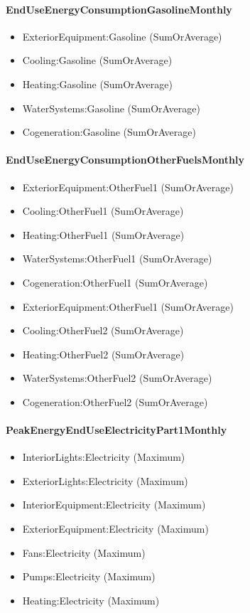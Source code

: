 \paragraph{EndUseEnergyConsumptionGasolineMonthly}\label{enduseenergyconsumptiongasolinemonthly}

\begin{itemize}
\item
  ExteriorEquipment:Gasoline (SumOrAverage)
\item
  Cooling:Gasoline (SumOrAverage)
\item
  Heating:Gasoline (SumOrAverage)
\item
  WaterSystems:Gasoline (SumOrAverage)
\item
  Cogeneration:Gasoline (SumOrAverage)
\end{itemize}

\paragraph{EndUseEnergyConsumptionOtherFuelsMonthly}\label{enduseenergyconsumptionotherfuelsmonthly}

\begin{itemize}
\item
  ExteriorEquipment:OtherFuel1 (SumOrAverage)
\item
  Cooling:OtherFuel1 (SumOrAverage)
\item
  Heating:OtherFuel1 (SumOrAverage)
\item
  WaterSystems:OtherFuel1 (SumOrAverage)
\item
  Cogeneration:OtherFuel1 (SumOrAverage)
\item
  ExteriorEquipment:OtherFuel1 (SumOrAverage)
\item
  Cooling:OtherFuel2 (SumOrAverage)
\item
  Heating:OtherFuel2 (SumOrAverage)
\item
  WaterSystems:OtherFuel2 (SumOrAverage)
\item
  Cogeneration:OtherFuel2 (SumOrAverage)
\end{itemize}

\paragraph{PeakEnergyEndUseElectricityPart1Monthly}\label{peakenergyenduseelectricitypart1monthly}

\begin{itemize}
\item
  InteriorLights:Electricity (Maximum)
\item
  ExteriorLights:Electricity (Maximum)
\item
  InteriorEquipment:Electricity (Maximum)
\item
  ExteriorEquipment:Electricity (Maximum)
\item
  Fans:Electricity (Maximum)
\item
  Pumps:Electricity (Maximum)
\item
  Heating:Electricity (Maximum)
\end{itemize}

